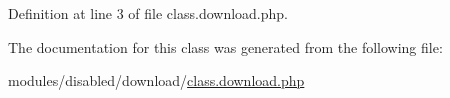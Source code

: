 Definition at line 3 of file class.\-download.\-php.



The documentation for this class was generated from the following file\-:\begin{DoxyCompactItemize}
\item 
modules/disabled/download/\hyperlink{class_8download_8php}{class.\-download.\-php}\end{DoxyCompactItemize}
